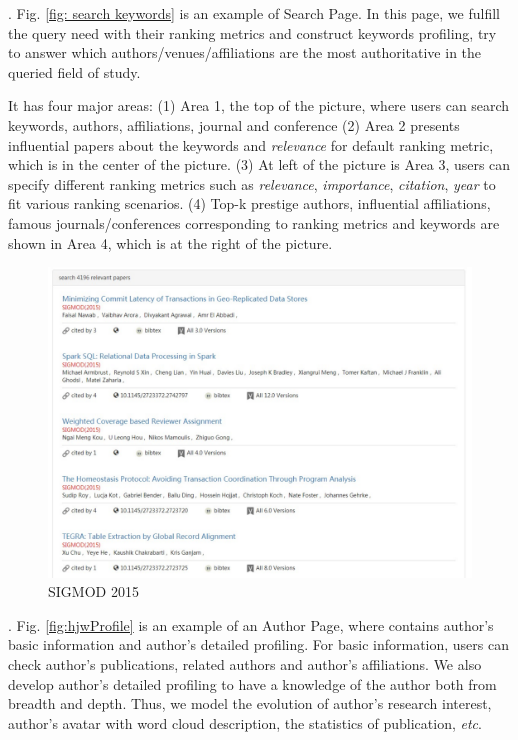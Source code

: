 . Fig. \ref{fig: search keywords} is an example of Search Page. In this page, we fulfill the query need with their ranking metrics and construct keywords profiling,
try to answer which authors/venues/affiliations are the most authoritative in the queried field of study.

\par

It has four major areas: (1) Area 1, the top of the picture, where users can search keywords, authors, affiliations, journal and conference (2) Area 2 presents influential papers about the keywords and {\em relevance} for default ranking metric, which is in the center of the picture. (3) At left of the picture is Area 3, users can specify different ranking metrics such as {\em relevance}, {\em importance}, {\em citation}, {\em year} to fit various ranking scenarios. (4) Top-k prestige authors, influential affiliations, famous journals/conferences corresponding to ranking metrics and keywords are shown in Area 4, which is at the right of the picture.




\begin{figure}
\centering
\includegraphics[width=\columnwidth]{sigmod15.pdf}
\caption{SIGMOD 2015}
\label{fig:sigmod}
\vspace{-3ex}
\end{figure}


. Fig. \ref{fig:hjwProfile} is an example of an Author Page, where contains author's basic information and author's detailed profiling. For basic information, users can check author's publications, related authors and author's affiliations. We also develop author's detailed profiling to have a knowledge of the author both from breadth and depth. Thus, we model the evolution of author's research interest, author's avatar with word cloud description, the statistics of publication, {\em etc}.


